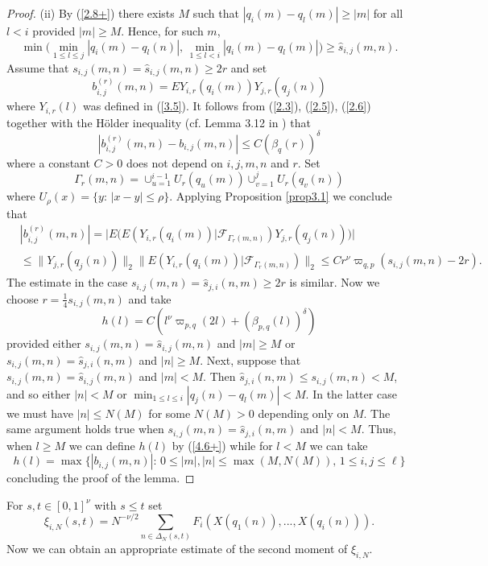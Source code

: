 \begin{proof}
 (ii) By (\ref{2.8+}) there exists $M$ such that $|q_i(m)-q_l(m)|\geq |m|$
 for all $l<i$ provided $|m|\geq M$. Hence, for such $m$,
 \[
 \min\big(\min_{1\leq l\leq j}|q_i(m)-q_l(n)|,\,\min_{1\leq l<i}|q_i(m)-
 q_l(m)|)\geq\hat s_{i,j}(m,n).
 \]
 Assume that $s_{i,j}(m,n)=\hat s_{i,j}(m,n)\geq 2r$ and set
\[
b^{(r)}_{i,j}(m,n)=EY_{i,r}(q_i(m))Y_{j,r}(q_j(n))
\]
where $Y_{i,r}(l)$ was defined in (\ref{3.5}). It follows from (\ref{2.3}),
(\ref{2.5}), (\ref{2.6})  together with the H\" older inequality (cf. Lemma
3.12 in \cite{KV}) that
\begin{equation}\label{4.5}
|b^{(r)}_{i,j}(m,n)-b_{i,j}(m,n)|\leq C({{\beta}}_q(r))^{{\delta}}
\end{equation}
where a constant $C>0$ does not depend on $i,j,m,n$ and $r$. Set
\[
{{\Gamma}}_r(m,n)=\cup_{u=1}^{i-1}U_r(q_u(m))\cup_{v=1}^jU_r(q_v(n))
\]
where $U_\rho(x)=\{ y:\, |x-y|\leq\rho\}$. Applying Proposition \ref{prop3.1} 
we conclude that
\begin{eqnarray}\label{4.6}
&|b_{i,j}^{(r)}(m,n)|=\big\vert E\big(E(Y_{i,r}(q_i(m))|{{\mathcal F}}_{{{\Gamma}}_r(m,n)})
Y_{j,r}(q_j(n))\big)\big\vert\\
&\leq\| Y_{j,r}(q_j(n))\|_2\| E(Y_{i,r}(q_i(m))|{{\mathcal F}}_{{{\Gamma}}_r(m,n)})\|_2\leq
Cr^\nu{{\varpi}}_{q,p}(s_{i,j}(m,n)-2r).\nonumber
\end{eqnarray}
The estimate in the case $s_{i,j}(m,n)=\hat s_{j,i}(n,m)\geq 2r$ is similar.
Now we choose $r=\frac 14s_{i,j}(m,n)$ and take 
\begin{equation}\label{4.6+}
h(l)=C(l^\nu{{\varpi}}_{p,q}(2l)+({{\beta}}_{p,q}(l))^{{\delta}})
\end{equation}
provided either $s_{i,j}(m,n)=\hat s_{i,j}(m,n)$ and $|m|\geq M$ or
$s_{i,j}(m,n)=\hat s_{j,i}(n,m)$ and $|n|\geq M$. Next, suppose that
$s_{i,j}(m,n)=\hat s_{i,j}(m,n)$ and $|m|< M$. Then $\hat s_{j,i}(n,m)\leq
s_{i,j}(m,n)<M$, and so either $|n|<M$ or $\min_{1\leq l\leq i}|q_j(n)-
q_l(m)|<M$. In the latter case we must have $|n|\leq N(M)$ for some $N(M)>0$
depending only on $M$. The same argument holds true when $s_{i,j}(m,n)=
\hat s_{j,i}(n,m)$ and $|n|<M$. Thus, when $l\geq M$ we can define $h(l)$ by
(\ref{4.6+}) while for $l<M$ we can take
\[
h(l)=\max\{ |b_{i,j}(m,n)|:\, 0\leq |m|,|n|\leq\max(M,N(M)),\, 1\leq i,j
\leq\ell\}
\]
concluding the proof of the lemma.
\end{proof}

For $s,t\in[0,1]^\nu$ with $s\leq t$ set
\[
\xi_{i,N}(s,t)=N^{-\nu/2}\sum_{n\in{{\Delta}}_N(s,t)}F_i(X(q_1(n)),...,X(q_i(n))).
\]
Now we can obtain an appropriate estimate of the second moment of $\xi_{i,N}$.

